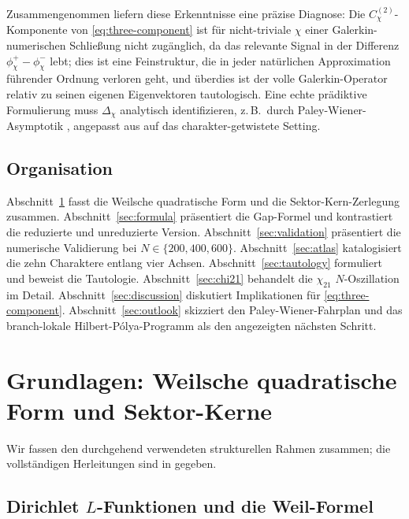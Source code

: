 \documentclass[a4paper,10pt,twocolumn]{article}
\theoremstyle{definition}
\theoremstyle{remark}
\newcommand{\chifn}{\chi}
\newcommand{\Deltachi}{\Delta_{\chifn}}
\begin{document}
Zusammengenommen liefern diese Erkenntnisse eine präzise Diagnose: Die
$C^{(2)}_{\chifn}$-Komponente von \eqref{eq:three-component} ist für
nicht-triviale $\chi$ einer Galerkin-numerischen Schließung
nicht zugänglich, da das relevante Signal in der Differenz
$\phi^+_{\chifn}-\phi^-_{\chifn}$ lebt; dies ist eine Feinstruktur, die in
jeder natürlichen Approximation führender Ordnung verloren geht, und überdies ist der volle
Galerkin-Operator relativ zu seinen eigenen Eigenvektoren tautologisch.
Eine echte prädiktive Formulierung muss
$\Deltachi$ analytisch identifizieren, z.\,B.\ durch Paley-Wiener-Asymptotik
\cite{PaleyWiener}, angepasst aus \cite{RH_II} auf das
charakter-getwistete Setting.

\subsection{Organisation}

Abschnitt~\ref{sec:setup} fasst die Weilsche quadratische Form und die
Sektor-Kern-Zerlegung zusammen. Abschnitt~\ref{sec:formula} präsentiert die
Gap-Formel und kontrastiert die reduzierte und unreduzierte Version.
Abschnitt~\ref{sec:validation} präsentiert die numerische Validierung bei
$N\in\{200,400,600\}$. Abschnitt~\ref{sec:atlas} katalogisiert die zehn
Charaktere entlang vier Achsen. Abschnitt~\ref{sec:tautology} formuliert
und beweist die Tautologie. Abschnitt~\ref{sec:chi21} behandelt die
$\chi_{21}$ $N$-Oszillation im Detail. Abschnitt~\ref{sec:discussion}
diskutiert Implikationen für \eqref{eq:three-component}. Abschnitt~\ref{sec:outlook}
skizziert den Paley-Wiener-Fahrplan und das branch-lokale
Hilbert-P\'olya-Programm als den angezeigten nächsten Schritt.

\section{Grundlagen: Weilsche quadratische Form und Sektor-Kerne}
\label{sec:setup}

Wir fassen den durchgehend verwendeten strukturellen Rahmen zusammen; die vollständigen
Herleitungen sind in \cite{AnalyticKernel} gegeben.

\subsection{\texorpdfstring{Dirichlet $L$-Funktionen}{Dirichlet L-Funktionen} und die Weil-Formel}
\end{document}
